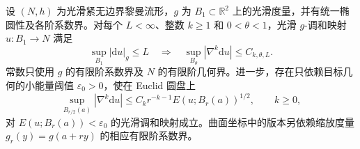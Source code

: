 \begin{theorem}\label{g3:thm:harmonic-map-interior-derivatives}
	设 \((N,h)\) 为光滑紧无边界黎曼流形，\(g\) 为 \(B_1\subset\mathbb R^2\) 上的光滑度量，并有统一椭圆性及各阶系数界。对每个 \(L<\infty\)、整数 \(k\ge1\) 和 \(0<\theta<1\)，光滑 \(g\)-调和映射 \(u:B_1\to N\) 满足
	\[
		\sup_{B_1}|\mathrm du|_g\le L
		\quad\Longrightarrow\quad
		\sup_{B_\theta}|\nabla^k\mathrm du|\le C_{k,\theta,L}.
	\]
	常数只使用 \(g\) 的有限阶系数界及 \(N\) 的有限阶几何界。进一步，存在只依赖目标几何的小能量阈值 \(\varepsilon_0>0\)，使在 Euclid 圆盘上
	\begin{equation}\label{g3:eq:harmonic-map-higher-energy-estimate}
		\sup_{B_{r/2}(a)}|\nabla^k\mathrm du|
		\le C_k r^{-k-1}E(u;B_r(a))^{1/2},\qquad k\ge0,
	\end{equation}
	对 \(E(u;B_r(a))<\varepsilon_0\) 的光滑调和映射成立。曲面坐标中的版本另依赖缩放度量 \(g_r(y)=g(a+ry)\) 的相应有限阶系数界。
\end{theorem}
